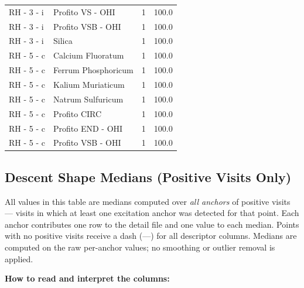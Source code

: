 \documentclass[a4paper,11pt]{article}
\begin{document}
\begin{footnotesize}
\begin{longtable}{p{3.5cm}p{7.5cm}rr}
RH - 3 - i & Profito VS - OHI & 1 & 100.0 \\
RH - 3 - i & Profito VSB - OHI & 1 & 100.0 \\
RH - 3 - i & Silica & 1 & 100.0 \\
RH - 5 - c & Calcium Fluoratum & 1 & 100.0 \\
RH - 5 - c & Ferrum Phosphoricum & 1 & 100.0 \\
RH - 5 - c & Kalium Muriaticum & 1 & 100.0 \\
RH - 5 - c & Natrum Sulfuricum & 1 & 100.0 \\
RH - 5 - c & Profito CIRC & 1 & 100.0 \\
RH - 5 - c & Profito END - OHI & 1 & 100.0 \\
RH - 5 - c & Profito VSB - OHI & 1 & 100.0 \\
\end{longtable}
\end{footnotesize}

\subsection{Descent Shape Medians (Positive Visits Only)}

All values in this table are medians computed over \emph{all anchors} of positive visits ---
visits in which at least one excitation anchor was detected for that point. Each anchor
contributes one row to the detail file and one value to each median. Points with no positive
visits receive a dash (---) for all descriptor columns.
Medians are computed on the raw per-anchor values; no smoothing or outlier removal is
applied.

\medskip
\noindent\textbf{How to read and interpret the columns:}
\end{document}
